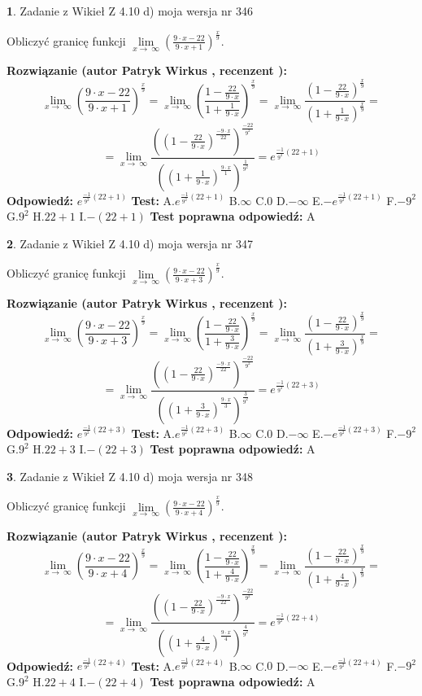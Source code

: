 \documentclass[12pt, a4paper]{article}
\theoremstyle{definition} %
\newtheorem{zad}{}
\newcommand{\zadStart}[1]{\begin{zad}#1\newline}
\newcommand{\zadStop}{\end{zad}}
\newcommand{\rozwStart}[2]{\noindent \textbf{Rozwiązanie (autor #1 , recenzent #2): }\newline}
\newcommand{\rozwStop}{\newline}
\newcommand{\odpStart}{\noindent \textbf{Odpowiedź:}\newline}
\newcommand{\odpStop}{\newline}
\newcommand{\testStart}{\noindent \textbf{Test:}\newline}
\newcommand{\testStop}{\newline}
\newcommand{\kluczStart}{\noindent \textbf{Test poprawna odpowiedź:}\newline}
\newcommand{\kluczStop}{\newline}
\begin{document}
\zadStart{Zadanie z Wikieł Z 4.10 d) moja wersja nr 346}


Obliczyć granicę funkcji  $\lim\limits_{x\to\ \infty}(\frac{9\cdot x-22}{9\cdot x+1})^{\frac{x}{9}}$.
\zadStop
\rozwStart{Patryk Wirkus}{}
$$\lim\limits_{x\to\ \infty}(\frac{9\cdot x-22}{9\cdot x+1})^{\frac{x}{9}} = \lim\limits_{x\to\ \infty}(\frac{1-\frac{22}{9\cdot x}}{1+\frac{1}{9\cdot x}})^{\frac{x}{9}}=\lim\limits_{x\to\ \infty}\frac{(1-\frac{22}{9\cdot x})^{\frac{x}{9}}}{(1+\frac{1}{9\cdot x})^{\frac{x}{9}}}=$$
$$=\lim\limits_{x\to\ \infty}\frac{((1-\frac{22}{9\cdot x})^{\frac{-9\cdot x}{22}})^{\frac{-22}{9^{2}}}}{((1+\frac{1}{9\cdot x})^{\frac{9\cdot x}{1}})^{\frac{1}{9^{2}}}}=e^{\frac{-1}{9^{2}}(22+1)}$$
\rozwStop
\odpStart
$e^{\frac{-1}{9^{2}}(22+1)}$
\odpStop
\testStart
A.$e^{\frac{-1}{9^{2}}(22+1)}$ B.$\infty$ C.$0$ D.$-\infty$ E.$-e^{\frac{-1}{9^{2}}(22+1)}$
F.$-9^{2}$ G.$9^{2}$
H.$22+1$
I.$-(22+1)$
\testStop
\kluczStart
A
\kluczStop



\zadStart{Zadanie z Wikieł Z 4.10 d) moja wersja nr 347}


Obliczyć granicę funkcji  $\lim\limits_{x\to\ \infty}(\frac{9\cdot x-22}{9\cdot x+3})^{\frac{x}{9}}$.
\zadStop
\rozwStart{Patryk Wirkus}{}
$$\lim\limits_{x\to\ \infty}(\frac{9\cdot x-22}{9\cdot x+3})^{\frac{x}{9}} = \lim\limits_{x\to\ \infty}(\frac{1-\frac{22}{9\cdot x}}{1+\frac{3}{9\cdot x}})^{\frac{x}{9}}=\lim\limits_{x\to\ \infty}\frac{(1-\frac{22}{9\cdot x})^{\frac{x}{9}}}{(1+\frac{3}{9\cdot x})^{\frac{x}{9}}}=$$
$$=\lim\limits_{x\to\ \infty}\frac{((1-\frac{22}{9\cdot x})^{\frac{-9\cdot x}{22}})^{\frac{-22}{9^{2}}}}{((1+\frac{3}{9\cdot x})^{\frac{9\cdot x}{3}})^{\frac{3}{9^{2}}}}=e^{\frac{-1}{9^{2}}(22+3)}$$
\rozwStop
\odpStart
$e^{\frac{-1}{9^{2}}(22+3)}$
\odpStop
\testStart
A.$e^{\frac{-1}{9^{2}}(22+3)}$ B.$\infty$ C.$0$ D.$-\infty$ E.$-e^{\frac{-1}{9^{2}}(22+3)}$
F.$-9^{2}$ G.$9^{2}$
H.$22+3$
I.$-(22+3)$
\testStop
\kluczStart
A
\kluczStop



\zadStart{Zadanie z Wikieł Z 4.10 d) moja wersja nr 348}


Obliczyć granicę funkcji  $\lim\limits_{x\to\ \infty}(\frac{9\cdot x-22}{9\cdot x+4})^{\frac{x}{9}}$.
\zadStop
\rozwStart{Patryk Wirkus}{}
$$\lim\limits_{x\to\ \infty}(\frac{9\cdot x-22}{9\cdot x+4})^{\frac{x}{9}} = \lim\limits_{x\to\ \infty}(\frac{1-\frac{22}{9\cdot x}}{1+\frac{4}{9\cdot x}})^{\frac{x}{9}}=\lim\limits_{x\to\ \infty}\frac{(1-\frac{22}{9\cdot x})^{\frac{x}{9}}}{(1+\frac{4}{9\cdot x})^{\frac{x}{9}}}=$$
$$=\lim\limits_{x\to\ \infty}\frac{((1-\frac{22}{9\cdot x})^{\frac{-9\cdot x}{22}})^{\frac{-22}{9^{2}}}}{((1+\frac{4}{9\cdot x})^{\frac{9\cdot x}{4}})^{\frac{4}{9^{2}}}}=e^{\frac{-1}{9^{2}}(22+4)}$$
\rozwStop
\odpStart
$e^{\frac{-1}{9^{2}}(22+4)}$
\odpStop
\testStart
A.$e^{\frac{-1}{9^{2}}(22+4)}$ B.$\infty$ C.$0$ D.$-\infty$ E.$-e^{\frac{-1}{9^{2}}(22+4)}$
F.$-9^{2}$ G.$9^{2}$
H.$22+4$
I.$-(22+4)$
\testStop
\kluczStart
A
\kluczStop
\end{document}
